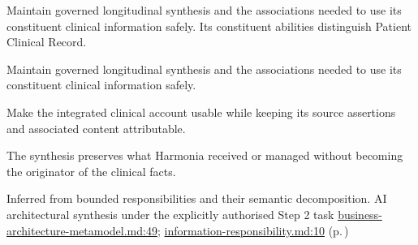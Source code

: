 Maintain governed longitudinal synthesis and the associations needed to use its constituent clinical information safely. Its constituent abilities distinguish Patient Clinical Record.



Maintain governed longitudinal synthesis and the associations needed to use its constituent clinical information safely.



Make the integrated clinical account usable while keeping its source assertions and associated content attributable.



The synthesis preserves what Harmonia received or managed without becoming the originator of the clinical facts.


Inferred from bounded responsibilities and their semantic decomposition. AI architectural synthesis under the explicitly authorised Step 2 task \hyperref[evidence:4bac85accd34ce0b]{business-architecture-metamodel.md:49}; \hyperref[evidence:be61392fefb4bb10]{information-responsibility.md:10}
 (p.\,\pageref{cap:bec-patient-clinical-record})
